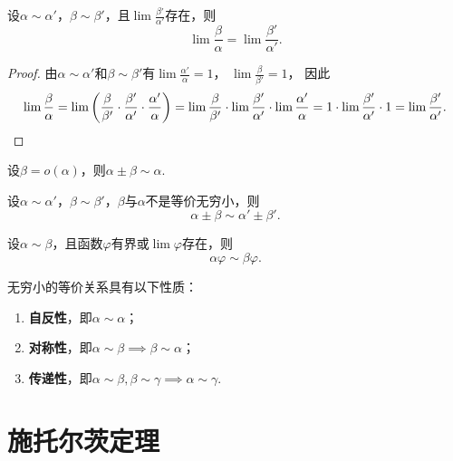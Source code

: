 \begin{theorem}\label{theorem:极限.无穷小的比较2}
设\(\alpha\sim\alpha'\)，\(\beta\sim\beta'\)，且\(\lim\frac{\beta'}{\alpha'}\)存在，则\[
	\lim\frac{\beta}{\alpha}=\lim\frac{\beta'}{\alpha'}.
\]
\begin{proof}
由\(\alpha\sim\alpha'\)和\(\beta\sim\beta'\)有\(\lim\frac{\alpha'}{\alpha} = 1\)，
\(\lim\frac{\beta}{\beta'} = 1\)，
因此\[
	\lim\frac{\beta}{\alpha}
	= \lim \left(
		\frac{\beta}{\beta'}
		\cdot \frac{\beta'}{\alpha'}
		\cdot \frac{\alpha'}{\alpha}
	\right)
	= \lim\frac{\beta}{\beta'}
		\cdot \lim \frac{\beta'}{\alpha'}
		\cdot \lim\frac{\alpha'}{\alpha}
	= 1 \cdot \lim \frac{\beta'}{\alpha'} \cdot 1
	= \lim \frac{\beta'}{\alpha'}.
	\qedhere
\]
\end{proof}
\end{theorem}

\begin{theorem}[和差取大规则]\label{theorem:极限.无穷小的比较3}
设\(\beta=o(\alpha)\)，则\(\alpha\pm\beta\sim\alpha\).
\end{theorem}

\begin{theorem}[和差代替规则]\label{theorem:极限.无穷小的比较4}
设\(\alpha\sim\alpha'\)，\(\beta\sim\beta'\)，\(\beta\)与\(\alpha\)不是等价无穷小，则\[
	\alpha\pm\beta\sim\alpha'\pm\beta'.
\]
\end{theorem}

\begin{theorem}[因式代替规则]\label{theorem:极限.无穷小的比较5}
设\(\alpha\sim\beta\)，且函数\(\varphi\)有界或\(\lim\varphi\)存在，则\[
	\alpha \varphi \sim \beta \varphi.
\]
\end{theorem}

\begin{property}\label{theorem:极限.无穷小的比较6}
无穷小的等价关系具有以下性质：
\begin{enumerate}
\item {\bf 自反性}，即\(\alpha \sim \alpha\)；
\item {\bf 对称性}，即\(\alpha \sim \beta \implies \beta \sim \alpha\)；
\item {\bf 传递性}，即\(\alpha \sim \beta, \beta \sim \gamma \implies \alpha \sim \gamma\).
\end{enumerate}
\end{property}

\section{施托尔茨定理}

